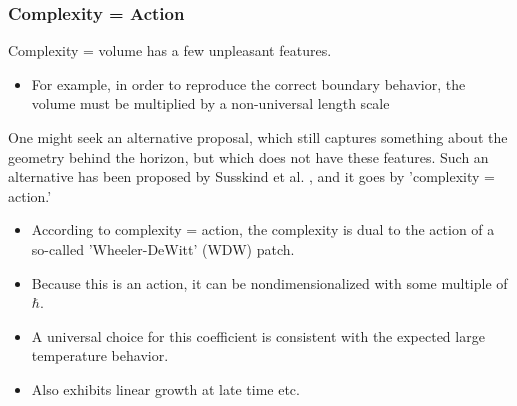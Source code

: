 \documentclass[8pt,aspectratio=169]{beamer}
\begin{document}
\begin{frame}
\frametitle{Complexity = Action}

Complexity = volume has a few unpleasant features.

\begin{itemize}

\item For example, in order to reproduce the correct boundary behavior, the volume must be multiplied by a non-universal length scale

\end{itemize}

One might seek an alternative proposal, which still captures something about the geometry behind the horizon, but which does not have these features. Such an alternative has been proposed by Susskind et al. \cite{Brown:2015bva, Brown:2015lvg}, and it goes by 'complexity = action.'

\begin{itemize}

\item According to complexity = action, the complexity is dual to the action of a so-called 'Wheeler-DeWitt' (WDW) patch.

\item Because this is an action, it can be nondimensionalized with some multiple of $\hbar$. 

\item A universal choice for this coefficient is consistent with the expected large temperature behavior. 

\item Also exhibits linear growth at late time etc.

\end{itemize}

\end{frame}
\end{document}
